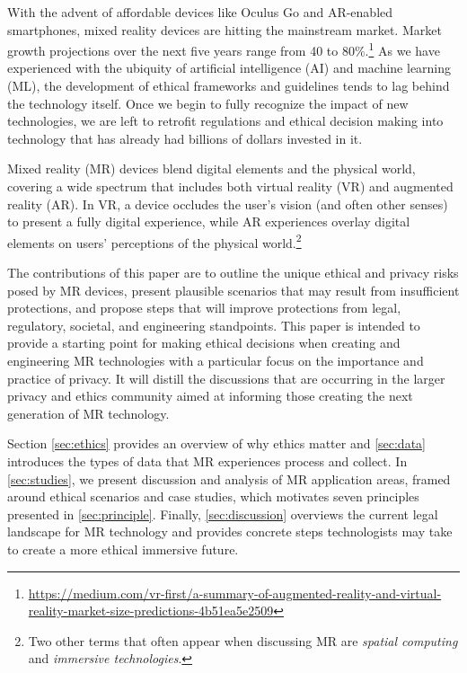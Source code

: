 With the advent of affordable devices like Oculus Go and AR-enabled smartphones, mixed reality devices are hitting the mainstream market. Market growth projections over the next five years range from 40 to 80\%.\footnote{\url{https://medium.com/vr-first/a-summary-of-augmented-reality-and-virtual-reality-market-size-predictions-4b51ea5e2509}} As we have experienced with the ubiquity of artificial intelligence (AI) and machine learning (ML), the development of ethical frameworks and guidelines tends to lag behind the technology itself. Once we begin to fully recognize the impact of new technologies, we are left to retrofit regulations and ethical decision making into technology that has already had billions of dollars invested in it.

Mixed reality (MR) devices blend digital elements and the physical world, covering a wide spectrum that includes both virtual reality (VR) and augmented reality (AR). In VR, a device occludes the user's vision (and often other senses) to present a fully digital experience, while AR experiences overlay digital elements on users' perceptions of the physical world.\footnote{Two other terms that often appear when discussing MR are \emph{spatial computing} and \emph{immersive technologies}.}

The contributions of this paper are to outline the unique ethical and privacy risks posed by MR devices, present plausible scenarios that may result from insufficient protections, and propose steps that will improve protections from legal, regulatory, societal, and engineering standpoints. This paper is intended to provide a starting point for making ethical decisions when creating and engineering MR technologies with a particular focus on the importance and practice of privacy. It will distill the discussions that are occurring in the larger privacy and ethics community aimed at informing those creating the next generation of MR technology.

Section \ref{sec:ethics} provides an overview of why ethics matter and \autoref{sec:data} introduces the types of data that MR experiences process and collect. In \autoref{sec:studies}, we present discussion and analysis of MR application areas, framed around ethical scenarios and case studies, which motivates seven principles presented in \autoref{sec:principle}. Finally, \autoref{sec:discussion} overviews the current legal landscape for MR technology and provides concrete steps technologists may take to create a more ethical immersive future.


